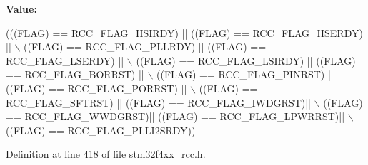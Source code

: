 {\bfseries Value\+:}
\begin{DoxyCode}
(((FLAG) == RCC\_FLAG\_HSIRDY) || ((FLAG) == RCC\_FLAG\_HSERDY) || \(\backslash\)
                           ((FLAG) == RCC\_FLAG\_PLLRDY) || ((FLAG) == RCC\_FLAG\_LSERDY) || \(\backslash\)
                           ((FLAG) == RCC\_FLAG\_LSIRDY) || ((FLAG) == RCC\_FLAG\_BORRST) || \(\backslash\)
                           ((FLAG) == RCC\_FLAG\_PINRST) || ((FLAG) == RCC\_FLAG\_PORRST) || \(\backslash\)
                           ((FLAG) == RCC\_FLAG\_SFTRST) || ((FLAG) == RCC\_FLAG\_IWDGRST)|| \(\backslash\)
                           ((FLAG) == RCC\_FLAG\_WWDGRST)|| ((FLAG) == RCC\_FLAG\_LPWRRST)|| \(\backslash\)
                           ((FLAG) == RCC\_FLAG\_PLLI2SRDY))
\end{DoxyCode}


Definition at line 418 of file stm32f4xx\+\_\+rcc.\+h.

